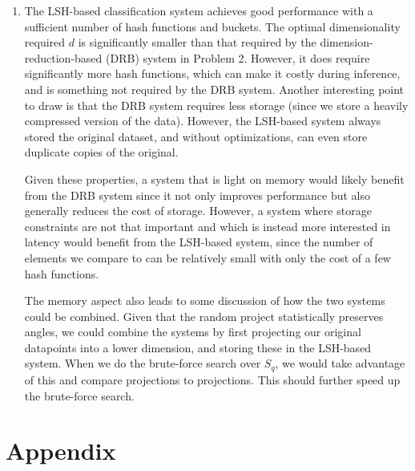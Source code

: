 \documentclass[12pt]{article}
\begin{document}
\begin{enumerate}[label=(\alph*)]
  \item
    The LSH-based classification system achieves good performance with a sufficient number of hash functions and buckets. The optimal dimensionality required $d$ is significantly smaller than that required by the dimension-reduction-based (DRB) system in Problem 2. However, it does require significantly more hash functions, which can make it costly during inference, and is something not required by the DRB system. Another interesting point to draw is that the DRB system requires less storage (since we store a heavily compressed version of the data). However, the LSH-based system always stored the original dataset, and without optimizations, can even store duplicate copies of the original.

    Given these properties, a system that is light on memory would likely benefit from the DRB system since it not only improves performance but also generally reduces the cost of storage. However, a system where storage constraints are not that important and which is instead more interested in latency would benefit from the LSH-based system, since the number of elements we compare to can be relatively small with only the cost of a few hash functions.

    The memory aspect also leads to some discussion of how the two systems could be combined. Given that the random project statistically preserves angles, we could combine the systems by first projecting our original datapoints into a lower dimension, and storing these in the LSH-based system. When we do the brute-force search over $S_q$, we would take advantage of this and compare projections to projections. This should further speed up the brute-force search.
\end{enumerate}

\newpage
\section*{Appendix}

\end{document}
